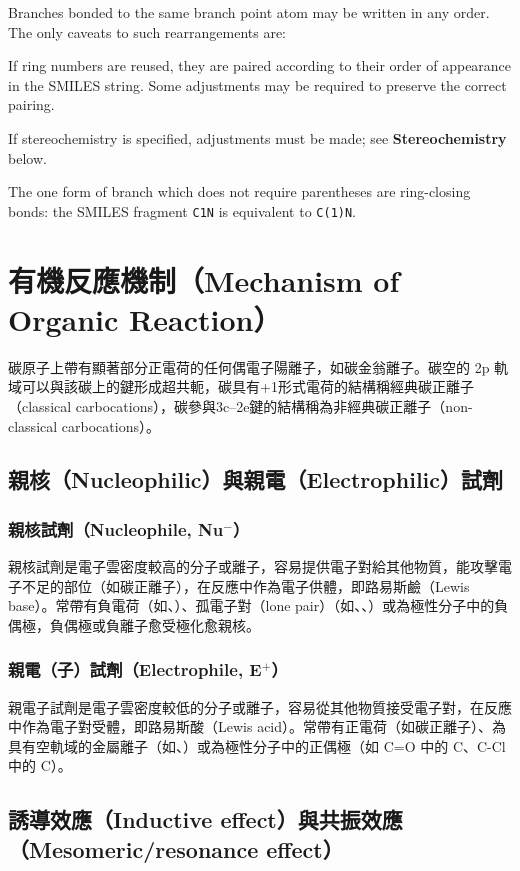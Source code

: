 \documentclass[a4paper,12pt]{report}
\begin{document}
Branches bonded to the same branch point atom may be written in any order. The only caveats to such rearrangements are:
\bit
\item If ring numbers are reused, they are paired according to their order of appearance in the SMILES string. Some adjustments may be required to preserve the correct pairing.
\item If stereochemistry is specified, adjustments must be made; see \textbf{Stereochemistry} below.
\eit

The one form of branch which does not require parentheses are ring-closing bonds: the SMILES fragment \texttt{C1N} is equivalent to \texttt{C(1)N}.


\section{有機反應機制（Mechanism of Organic Reaction）}
碳原子上帶有顯著部分正電荷的任何偶電子陽離子，如碳金翁離子。碳空的 2p 軌域可以與該碳上的鍵形成超共軛，碳具有+1形式電荷的結構稱經典碳正離子（classical carbocations），碳參與3c–2e鍵的結構稱為非經典碳正離子（non-classical carbocations）。
\subsection{親核（Nucleophilic）與親電（Electrophilic）試劑}
\subsubsection{親核試劑（Nucleophile, Nu$^-$）}
親核試劑是電子雲密度較高的分子或離子，容易提供電子對給其他物質，能攻擊電子不足的部位（如碳正離子），在反應中作為電子供體，即路易斯鹼（Lewis base）。常帶有負電荷（如、）、孤電子對（lone pair）（如、、）或為極性分子中的負偶極，負偶極或負離子愈受極化愈親核。
\subsubsection{親電（子）試劑（Electrophile, E$^+$）}
親電子試劑是電子雲密度較低的分子或離子，容易從其他物質接受電子對，在反應中作為電子對受體，即路易斯酸（Lewis acid）。常帶有正電荷（如碳正離子）、為具有空軌域的金屬離子（如、）或為極性分子中的正偶極（如 C=O 中的 C、C-Cl 中的 C）。
\subsection{誘導效應（Inductive effect）與共振效應（Mesomeric/resonance effect）}
\end{document}
